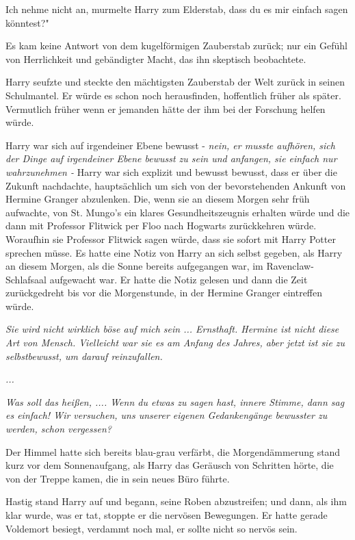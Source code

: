 \glqq{}Ich nehme nicht an\grqq{}, murmelte Harry zum Elderstab, \glqq{}dass du es
mir einfach sagen könntest?"

Es kam keine Antwort von dem kugelförmigen Zauberstab zurück; nur ein Gefühl von
Herrlichkeit und gebändigter Macht, das ihn skeptisch beobachtete.

Harry seufzte und steckte den mächtigsten Zauberstab der Welt zurück in seinen
Schulmantel. Er würde es schon noch herausfinden, hoffentlich früher als später.
Vermutlich früher wenn er jemanden hätte der ihm bei der Forschung helfen würde.

Harry war sich auf irgendeiner Ebene bewusst -\emph{ nein, er musste aufhören,
sich der Dinge auf irgendeiner Ebene bewusst zu sein und anfangen, sie einfach
nur wahrzunehmen -} Harry war sich explizit und bewusst bewusst, dass er über
die Zukunft nachdachte, hauptsächlich um sich von der bevorstehenden Ankunft von
Hermine Granger abzulenken. Die, wenn sie an diesem Morgen sehr früh aufwachte,
von St. Mungo's ein klares Gesundheitszeugnis erhalten würde und die dann mit
Professor Flitwick per Floo nach Hogwarts zurückkehren würde. Woraufhin sie
Professor Flitwick sagen würde, dass sie sofort mit Harry Potter sprechen müsse.
Es hatte eine Notiz von Harry an sich selbst gegeben, als Harry an diesem
Morgen, als die Sonne bereits aufgegangen war, im Ravenclaw-Schlafsaal
aufgewacht war. Er hatte die Notiz gelesen und dann die Zeit zurückgedreht bis
vor die Morgenstunde, in der Hermine Granger eintreffen würde.

\emph{Sie wird nicht wirklich böse auf mich sein ... Ernsthaft. Hermine ist
nicht diese Art von Mensch. Vielleicht war sie es am Anfang des Jahres, aber
jetzt ist sie zu selbstbewusst, um darauf reinzufallen.}

\emph{...}

\emph{Was soll das heißen, \glqq{}...\grqq{}. Wenn du etwas zu sagen hast, innere
Stimme, dann sag es einfach! Wir versuchen, uns unserer eigenen Gedankengänge
bewusster zu werden, schon vergessen?}

Der Himmel hatte sich bereits blau-grau verfärbt, die Morgendämmerung stand kurz
vor dem Sonnenaufgang, als Harry das Geräusch von Schritten hörte, die von der
Treppe kamen, die in sein neues Büro führte.

Hastig stand Harry auf und begann, seine Roben abzustreifen; und dann, als ihm
klar wurde, was er tat, stoppte er die nervösen Bewegungen. Er hatte gerade
Voldemort besiegt, verdammt noch mal, er sollte nicht so nervös sein.

